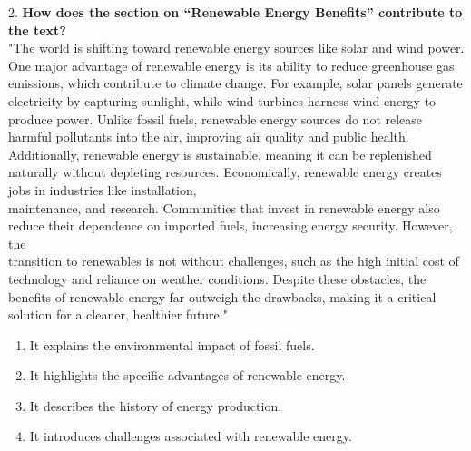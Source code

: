 \documentclass[12pt]{article}
\begin{document}
\vspace{1cm}

2. \textbf{How does the section on “Renewable Energy Benefits” contribute to the text?}\\
"The world is shifting toward renewable energy sources like solar and wind power. One major advantage of renewable energy is its ability to reduce greenhouse gas emissions, which contribute to climate change. For example, solar panels generate electricity by capturing sunlight, while wind turbines harness wind energy to produce power. Unlike fossil fuels, renewable energy sources do not release harmful pollutants into the air, improving air quality and public health. Additionally, renewable energy is sustainable, meaning it can be replenished naturally without depleting resources. Economically, renewable energy creates jobs in industries like installation, \\maintenance, and research. Communities that invest in renewable energy also reduce their dependence on imported fuels, increasing energy security. However, the \\transition to renewables is not without challenges, such as the high initial cost of technology and reliance on weather conditions. Despite these obstacles, the benefits of renewable energy far outweigh the drawbacks, making it a critical solution for a cleaner, healthier future."\\
\begin{enumerate}[label=\Alph*.]
    \item It explains the environmental impact of fossil fuels.  
    \item It highlights the specific advantages of renewable energy.  
    \item It describes the history of energy production.  
    \item It introduces challenges associated with renewable energy.  
\end{enumerate}

\vspace{1cm}
\end{document}
